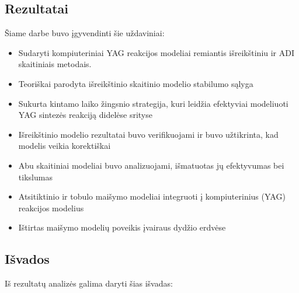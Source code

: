 
\subsection*{Rezultatai}

Šiame darbe buvo įgyvendinti šie uždaviniai:

\begin{itemize}
    \item Sudaryti kompiuteriniai YAG reakcijos modeliai remiantis išreikštiniu ir ADI skaitiniais metodais. 
    \item Teoriškai parodyta išreikštinio skaitinio modelio stabilumo sąlyga
    \item Sukurta kintamo laiko žingsnio strategija, kuri leidžia efektyviai modeliuoti YAG sintezės reakciją didelėse srityse
    \item Išreikštinio modelio rezultatai buvo verifikuojami ir buvo užtikrinta, kad modelis veikia korektiškai 
    \item Abu skaitiniai modeliai buvo analizuojami, išmatuotas jų efektyvumas bei tikslumas
    \item Atsitiktinio ir tobulo maišymo modeliai integruoti į kompiuterinius (YAG) reakcijos modelius
    \item Ištirtas maišymo modelių poveikis įvairaus dydžio erdvėse 
\end{itemize}

\subsection*{Išvados}

Iš rezultatų analizės galima daryti šias išvadas:

